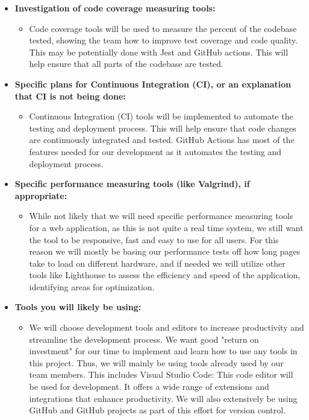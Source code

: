 \documentclass{article}
\begin{document}
\begin{itemize}
  \item \textbf{Investigation of code coverage measuring tools:}
  \begin{itemize}
    \item Code coverage tools will be used to measure the percent of the codebase tested, showing the team how to improve test coverage and code quality. This may be potentially done with Jest and GitHub actions. This will help ensure  that all parts of the codebase are tested.
  \end{itemize}
  
  \item \textbf{Specific plans for Continuous Integration (CI), or an explanation that CI is not being done:}
  \begin{itemize}
    \item Continuous Integration (CI) tools will be implemented to automate the testing and deployment process. This will help ensure that code changes are continuously integrated and tested. GitHub Actions has most of the features needed for our development as it automates the testing and deployment process.
  \end{itemize}
  
  \item \textbf{Specific performance measuring tools (like Valgrind), if appropriate:}
  \begin{itemize}
    \item While not likely that we will need specific performance measuring tools for a web application, as this is not quite a real time system, we still want the tool to be responsive, fast and easy to use for all users. For this reason we will mostly be basing our performance tests off how long pages take to load on different hardware, and if needed we will utilize other tools like Lighthouse to assess the efficiency and speed of the application, identifying areas for optimization.
  \end{itemize}
  
  \item \textbf{Tools you will likely be using:}
  \begin{itemize}
    \item We will choose development tools and editors to increase productivity and streamline the development process. We want good "return on investment" for our time to implement and learn how to use any tools in this project. Thus, we will mainly be using tools already used by our team members. This includes Visual Studio Code: This code editor will be used for development. It offers a wide range of extensions and integrations that enhance productivity. We will also extensively be using GitHub and GitHub projects as part of this effort for version control.
  \end{itemize}
\end{itemize}
\end{document}
